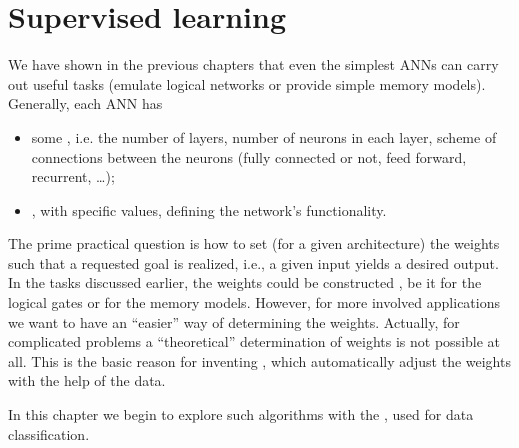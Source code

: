 \documentclass[letterpaper,10pt,english]{jupyterBook}
\begin{document}
\section{Supervised learning}
\label{\detokenize{docs/perceptron:supervised-learning}}
\sphinxAtStartPar
We have shown in the previous chapters that even the simplest ANNs can carry out useful tasks (emulate logical networks or provide simple memory models). Generally, each ANN has
\begin{itemize}
\item {} 
\sphinxAtStartPar
some , i.e. the number of layers, number of neurons in each layer, scheme of connections between the neurons (fully connected or not, feed forward, recurrent, …);

\item {} 
\sphinxAtStartPar
{}, with specific values, defining the network’s functionality.

\end{itemize}

\sphinxAtStartPar
The prime practical question is how to set (for a given architecture) the weights such that a requested goal is realized, i.e., a given input yields a desired output.
In the tasks discussed earlier, the weights could be constructed , be it for the logical gates or for the memory models. However, for more involved applications we want to have an “easier” way of determining the weights. Actually, for complicated problems a “theoretical” determination of weights is not possible at all. This is the basic reason for inventing , which automatically adjust the weights with the help of the data.

\sphinxAtStartPar
In this chapter we begin to explore such algorithms with the , used for data classification.
\end{document}
